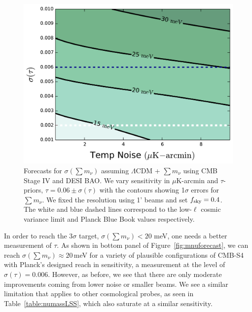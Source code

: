 \begin{figure}[h!]
\begin{center}
\includegraphics[scale=0.6]{Neutrinos/Mnu_tauprior.pdf}

\caption{ Forecasts for $\sigma(\sum m_\nu)$ assuming $\Lambda$CDM + $\sum m_\nu$ using CMB Stage IV and DESI BAO.  We vary sensitivity in $\mu$K-arcmin and $\tau$-priors, $\tau = 0.06 \pm \sigma(\tau)$ with the contours showing 1$\sigma$ errors for $\sum m_\nu$.  We fixed the resolution using 1' beams and set $f_{\rm sky} =0.4$.  The white and blue dashed lines correspond to the low-$\ell$ cosmic variance limit and Planck Blue Book values respectively. }
\label{fig:mnu_tau}
\end{center}
\end{figure} 

In order to reach the 3$\sigma$ target, $\sigma(\sum m_\nu) < 20$ meV,
one needs a better measurement of $\tau$.
As shown in bottom panel of Figure~\ref{fig:mnuforecast},
we can reach $\sigma(\sum m_\nu) \approx 20$\,meV for a variety of plausible
configurations of CMB-S4 with Planck's designed reach in sensitivity, a
measurement at the level of $\sigma(\tau) = 0.006$.
 However, as before, we see that there are only moderate improvements coming from lower noise or smaller beams.  We see a similar limitation that applies to other cosmological probes, as seen in Table~\ref{table:numassLSS}, which also saturate at a similar sensitivity.

